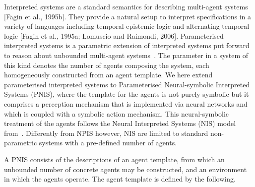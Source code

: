 Interpreted systems are a standard semantics for describing multi-agent systems
[Fagin et al., 1995b]. They provide a natural setup to interpret specifications
in a variety of languages including temporal-epistemic logic and alternating
temporal logic [Fagin et al., 1995a; Lomuscio and Raimondi, 2006].
Parameterised interpreted systems is a parametric extension of interpreted
systems put forward to reason about unbounded multi-agent
systems~\cite{KouvarosLomuscio15b}. The parameter in a system of this kind
denotes the number of agents composing the system, each homogeneously
constructed from an agent template. We here extend parameterised interpreted
systems to Parameterised Neural-symbolic Interpreted Systems (PNIS), where the
template for the agents is not purely symbolic but it comprises a perception
mechanism that is implemented via neural networks and which is coupled with a
symbolic action mechanism. This neural-symbolic treatment of the agents follows
the Neural Interpreted Systems (NIS) model from~\cite{Akintunde+20b}.
Differently from NPIS however, NIS are limited to standard non-parametric
systems with a pre-defined number of agents.

A PNIS consists of the descriptions of an agent template, from which an
unbounded number of concrete agents may be constructed, and an environment in
which the agents operate. The agent template is defined by the following. 

